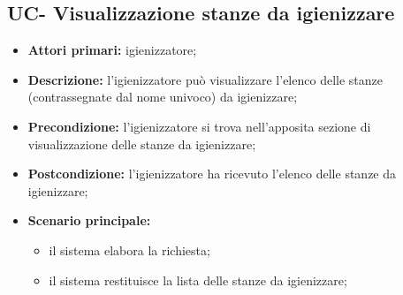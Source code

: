 \subsection{UC- Visualizzazione stanze da igienizzare}

\begin{itemize}
\item \textbf{Attori primari:} igienizzatore;
\item \textbf{Descrizione:} l’igienizzatore può visualizzare l'elenco delle stanze (contrassegnate dal nome univoco) da igienizzare;
\item \textbf{Precondizione:} l'igienizzatore si trova nell’apposita sezione di visualizzazione delle stanze da igienizzare; 
\item \textbf{Postcondizione:} l'igienizzatore ha ricevuto l'elenco delle stanze da igienizzare;
\item \textbf{Scenario principale:} 
	\begin{itemize}
		\item il sistema elabora la richiesta;
		\item il sistema restituisce la lista delle stanze da igienizzare;
		\end{itemize}
\end{itemize}




